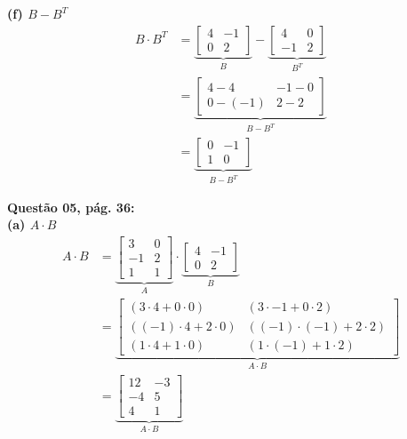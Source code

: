 \documentclass[a4paper,12pt]{article}
\begin{document}
\textbf{(f) $B - B^{T}$}
\begin{align*}
B \cdot B^{T}&=
    \underbrace{
    \begin{bmatrix}
        4 & -1\\
        0 & 2
    \end{bmatrix}}_{B} 
    -
    \underbrace{
    \begin{bmatrix}
        4 & 0\\
        -1 & 2
    \end{bmatrix}}_{B^{T}} \\
    &=
    \underbrace{
    \begin{bmatrix}
        4 - 4 & -1 - 0\\
        0 - (-1) & 2 - 2
    \end{bmatrix}}_{B - B^{T}} \\
    &=
    \underbrace{
    \begin{bmatrix}
        0 & -1\\
        1 & 0
    \end{bmatrix}}_{B - B^{T}} 
\end{align*}

\textbf{Questão 05, pág. 36:}\\

\textbf{(a) $A \cdot B$}
\begin{align*}
A \cdot B&=
    \underbrace{
    \begin{bmatrix}
        3 & 0\\
        -1 & 2\\
        1 & 1
    \end{bmatrix}}_{A} 
    \cdot
    \underbrace{
    \begin{bmatrix}
        4 & -1\\
        0 & 2
    \end{bmatrix}}_{B} \\
    &=
    \underbrace{
    \begin{bmatrix}
        (3\cdot 4 + 0 \cdot 0) & (3 \cdot -1 + 0 \cdot 2)\\
        ((-1) \cdot 4 + 2 \cdot 0) & ((-1) \cdot (-1) + 2 \cdot 2)\\
        (1 \cdot 4 + 1 \cdot 0) & (1 \cdot (-1) + 1 \cdot 2)
    \end{bmatrix}}_{A \cdot B} \\
    &=
    \underbrace{
    \begin{bmatrix}
        12 & -3\\
        -4 & 5 \\
        4 & 1
    \end{bmatrix}}_{A \cdot B} 
\end{align*}
\end{document}
